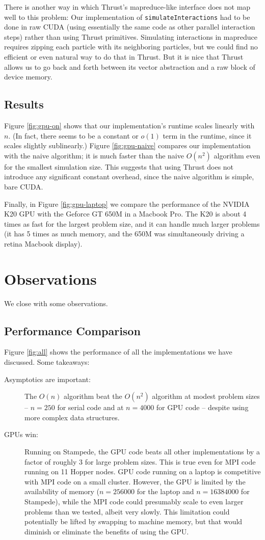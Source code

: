 \documentclass{article}
\newcommand{\code}[1]%
  {\texttt{#1}}
\begin{document}
There is another way in which Thrust's mapreduce-like interface does not map well to this problem: Our implementation of \code{simulateInteractions} had to be done in raw CUDA (using essentially the same code as other parallel interaction steps) rather than using Thrust primitives.  Simulating interactions in mapreduce requires zipping each particle with its neighboring particles, but we could find no efficient or even natural way to do that in Thrust.  But it is nice that Thrust allows us to go back and forth between its vector abstraction and a raw block of device memory.

\subsection{Results}
Figure \ref{fig:gpu-on} shows that our implementation's runtime scales linearly with $n$.  (In fact, there seems to be a constant or $o(1)$ term in the runtime, since it scales slightly sublinearly.)  Figure \ref{fig:gpu-naive} compares our implementation with the naive algorithm; it is much faster than the naive $O(n^2)$ algorithm even for the smallest simulation size.  This suggests that using Thrust does not introduce any significant constant overhead, since the naive algorithm is simple, bare CUDA.

Finally, in Figure \ref{fig:gpu-laptop} we compare the performance of the NVIDIA K20 GPU with the Geforce GT 650M in a Macbook Pro.  The K20 is about 4 times as fast for the largest problem size, and it can handle much larger problems (it has 5 times as much memory, and the 650M was simultaneously driving a retina Macbook display).

\section{Observations}
We close with some observations.

\subsection{Performance Comparison}
Figure \ref{fig:all} shows the performance of all the implementations we have discussed.  Some takeaways:
\begin{description}
  \item[Asymptotics are important:] The $O(n)$ algorithm beat the $O(n^2)$ algorithm at modest problem sizes -- $n=250$ for serial code and at $n=4000$ for GPU code -- despite using more complex data structures.
  \item[GPUs win:] Running on Stampede, the GPU code beats all other implementations by a factor of roughly 3 for large problem sizes.  This is true even for MPI code running on 11 Hopper nodes.  GPU code running on a laptop is competitive with MPI code on a small cluster.  However, the GPU is limited by the availability of memory ($n=256000$ for the laptop and $n=16384000$ for Stampede), while the MPI code could presumably scale to even larger problems than we tested, albeit very slowly.  This limitation could potentially be lifted by swapping to machine memory, but that would diminish or eliminate the benefits of using the GPU.
\end{description}
\end{document}
